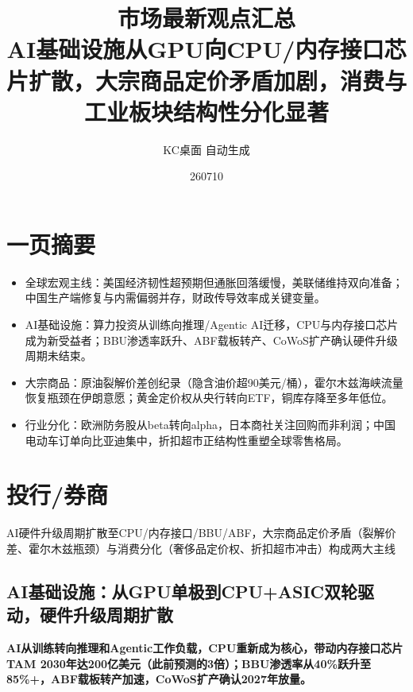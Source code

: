 \documentclass[11pt]{ctexart}
\title{\textbf{市场最新观点汇总}\\[0.4em]{\large AI基础设施从GPU向CPU/内存接口芯片扩散，大宗商品定价矛盾加剧，消费与工业板块结构性分化显著}}
\author{KC桌面 自动生成}
\date{260710}
\begin{document}
\maketitle
\tableofcontents
\newpage
\section{一页摘要}
\begin{itemize}
  \item 全球宏观主线：美国经济韧性超预期但通胀回落缓慢，美联储维持双向准备；中国生产端修复与内需偏弱并存，财政传导效率成关键变量。
  \item AI基础设施：算力投资从训练向推理/Agentic AI迁移，CPU与内存接口芯片成为新受益者；BBU渗透率跃升、ABF载板转产、CoWoS扩产确认硬件升级周期未结束。
  \item 大宗商品：原油裂解价差创纪录（隐含油价超90美元/桶），霍尔木兹海峡流量恢复瓶颈在伊朗意愿；黄金定价权从央行转向ETF，铜库存降至多年低位。
  \item 行业分化：欧洲防务股从beta转向alpha，日本商社关注回购而非利润；中国电动车订单向比亚迪集中，折扣超市正结构性重塑全球零售格局。
\end{itemize}
\section{投行/券商}
AI硬件升级周期扩散至CPU/内存接口/BBU/ABF，大宗商品定价矛盾（裂解价差、霍尔木兹瓶颈）与消费分化（奢侈品定价权、折扣超市冲击）构成两大主线

\subsection{AI基础设施：从GPU单极到CPU+ASIC双轮驱动，硬件升级周期扩散}
\textbf{AI从训练转向推理和Agentic工作负载，CPU重新成为核心，带动内存接口芯片TAM 2030年达200亿美元（此前预测的3倍）；BBU渗透率从40\%跃升至85\%+，ABF载板转产加速，CoWoS扩产确认2027年放量。}
\end{document}
